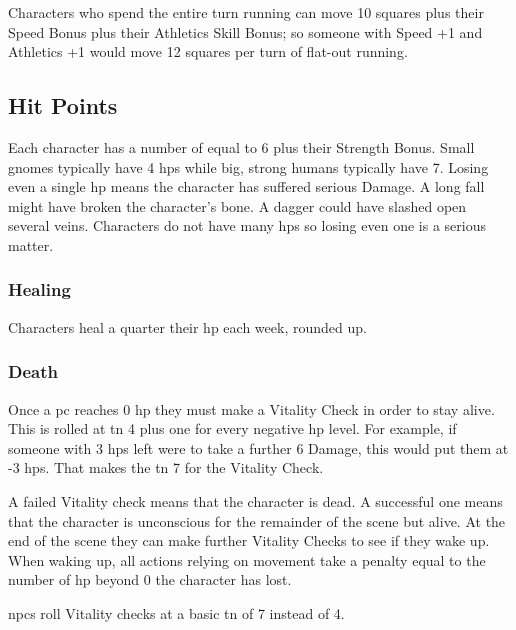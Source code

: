 \begin{multicols}{2}
Characters who spend the entire turn running can move 10 squares plus their Speed Bonus plus their Athletics Skill Bonus; so someone with Speed +1 and Athletics +1 would move 12 squares per turn of flat-out running.


\subsection{Hit Points}

Each character has a number of  equal to 6 plus their Strength Bonus.
Small gnomes typically have 4 \glspl{hp} while big, strong humans typically have 7.
Losing even a single \gls{hp} means the character has suffered serious Damage.
A long fall might have broken the character's bone.
A dagger could have slashed open several veins.
Characters do not have many \glspl{hp} so losing even one is a serious matter.

\subsubsection{Healing}
Characters heal a quarter their \gls{hp} each week, rounded up.

\subsubsection{Death}
Once a \gls{pc} reaches 0 \gls{hp} they must make a Vitality Check in order to stay alive.
This is rolled at \gls{tn} 4 plus one for every negative \gls{hp} level.\iftoggle{verbose}{\footnote{Traits such as Strength do not affect the Vitality check because in a way, they already have.
Stronger characters already have more \gls{hp}, which has already kept them farther from death.}}{}
For example, if someone with 3 \glspl{hp} left were to take a further 6 Damage, this would put them at -3 \glspl{hp}.
That makes the \gls{tn} 7 for the Vitality Check.

A failed Vitality check means that the character is dead.%
\iftoggle{verbose}{%
\footnote{See page \pageref{pcdeath} on what to do once a \gls{pc} dies.}%
}{}
A successful one means that the character is unconscious for the remainder of the scene but alive.
At the end of the scene they can make further Vitality Checks to see if they wake up.
When waking up, all actions relying on movement take a penalty equal to the number of \gls{hp} beyond 0 the character has lost.

\glspl{npc} roll Vitality checks at a basic \gls{tn} of 7 instead of 4.


\end{multicols}

